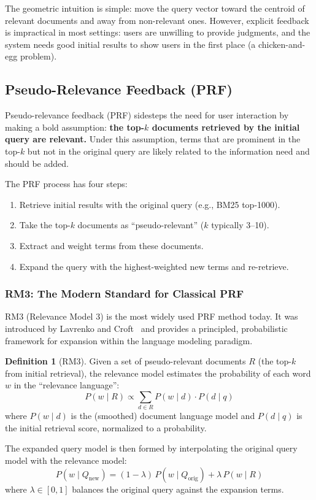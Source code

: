 \documentclass[11pt,a4paper]{article}
\theoremstyle{definition}
\newtheorem{definition}{Definition}[section]
\theoremstyle{plain}
\begin{document}
The geometric intuition is simple: move the query vector toward the centroid of relevant documents and away from non-relevant ones. However, explicit feedback is impractical in most settings: users are unwilling to provide judgments, and the system needs good initial results to show users in the first place (a chicken-and-egg problem).

\subsection{Pseudo-Relevance Feedback (PRF)}

Pseudo-relevance feedback (PRF) sidesteps the need for user interaction by making a bold assumption: \textbf{the top-$k$ documents retrieved by the initial query are relevant.} Under this assumption, terms that are prominent in the top-$k$ but not in the original query are likely related to the information need and should be added.

The PRF process has four steps:
\begin{enumerate}
    \item Retrieve initial results with the original query (e.g., BM25 top-1000).
    \item Take the top-$k$ documents as ``pseudo-relevant'' ($k$ typically 3--10).
    \item Extract and weight terms from these documents.
    \item Expand the query with the highest-weighted new terms and re-retrieve.
\end{enumerate}

\subsubsection{RM3: The Modern Standard for Classical PRF}

RM3 (Relevance Model 3) is the most widely used PRF method today. It was introduced by Lavrenko and Croft~\cite{lavrenko2001relevance} and provides a principled, probabilistic framework for expansion within the language modeling paradigm.

\begin{definition}[RM3]
Given a set of pseudo-relevant documents $R$ (the top-$k$ from initial retrieval), the relevance model estimates the probability of each word $w$ in the ``relevance language'':
\begin{equation}
P(w \mid R) \propto \sum_{d \in R} P(w \mid d) \cdot P(d \mid q)
\label{eq:rm1}
\end{equation}
where $P(w \mid d)$ is the (smoothed) document language model and $P(d \mid q)$ is the initial retrieval score, normalized to a probability.

The expanded query model is then formed by interpolating the original query model with the relevance model:
\begin{equation}
P(w \mid Q_\text{new}) = (1 - \lambda)\, P(w \mid Q_\text{orig}) + \lambda\, P(w \mid R)
\label{eq:rm3}
\end{equation}
where $\lambda \in [0, 1]$ balances the original query against the expansion terms.
\end{definition}
\end{document}

